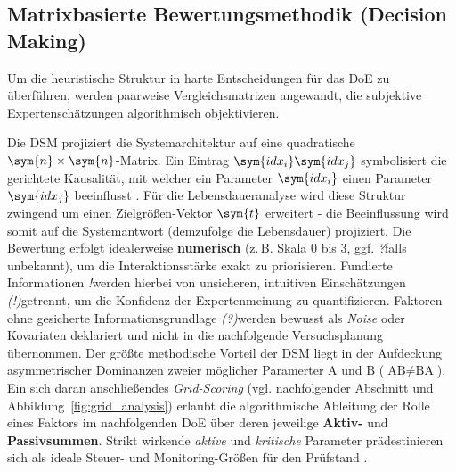 \subsection{Matrixbasierte Bewertungsmethodik (Decision Making)} \label{subsec:Decision}

Um die heuristische Struktur in harte Entscheidungen für das \ac{DoE} zu überführen, werden paarweise Vergleichsmatrizen angewandt, die subjektive Expertenschätzungen algorithmisch objektivieren.


Die \ac{DSM} projiziert die Systemarchitektur auf eine quadratische $\sym{n} \times \sym{n}$-Matrix.
Ein Eintrag ${\sym{idx_i}\sym{idx_j}}$ symbolisiert die gerichtete Kausalität, mit welcher ein Parameter $\sym{idx_i}$ einen Parameter $\sym{idx_j}$ beeinflusst \cite{Kremer.2018b,Lindemann.2008}.
Für die Lebensdaueranalyse wird diese Struktur zwingend um einen Zielgrößen-Vektor $\sym{t}$ erweitert - die Beeinflussung wird somit auf die Systemantwort (demzufolge die Lebensdauer) projiziert.
Die Bewertung erfolgt idealerweise \textbf{numerisch} (z.\,B. Skala 0 bis 3, ggf. \glqq\textit{?}\grqq falls unbekannt), um die Interaktionsstärke exakt zu priorisieren.
Fundierte Informationen \glqq\textit{!}\grqq werden hierbei von unsicheren, intuitiven Einschätzungen \glqq\textit{(!)}\grqq getrennt, um die Konfidenz der Expertenmeinung zu quantifizieren.
Faktoren ohne gesicherte Informationsgrundlage \glqq\textit{(?)}\grqq werden bewusst als \textit{Noise} oder Kovariaten deklariert und nicht in die nachfolgende Versuchsplanung übernommen.
Der größte methodische Vorteil der \ac{DSM} liegt in der Aufdeckung asymmetrischer Dominanzen zweier möglicher Paramerter ${\text{A}}$ und ${\text{B}}$  (${\text{AB}} \neq {\text{BA}}$).
Ein sich daran anschließendes \textit{Grid-Scoring} (vgl. nachfolgender Abschnitt und Abbildung~\ref{fig:grid_analysis}) erlaubt die algorithmische Ableitung der Rolle eines Faktors im nachfolgenden \ac{DoE} über deren jeweilige \textbf{Aktiv-} und \textbf{Passivsummen}.
Strikt wirkende \textit{aktive} und \textit{kritische} Parameter prädestinieren sich als ideale Steuer- und Monitoring-Größen für den Prüfstand \cite{Kremer.2021,Arndt.2023c}.


